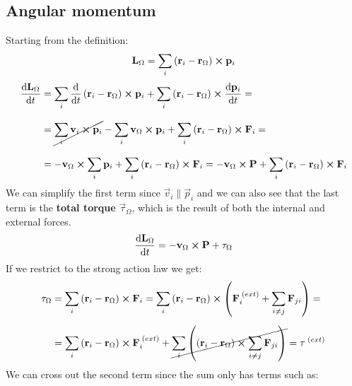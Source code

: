\subsection{Angular momentum}
Starting from the definition:
\begin{equation}
    \vb{L}_{\Omega} = \displaystyle\sum_{i}\left(\vb{r}_i-\vb{r}_{\Omega}\right)\cross\vb{p}_i
\end{equation}
\begin{equation}
    \begin{split}
      \dfrac{\dd{\vb{L}_{\Omega}}}{\dd{t}} &= \displaystyle\sum_{i}\dfrac{\dd{}}{\dd{t}}\left(\vb{r}_i-\vb{r}_{\Omega}\right)\cross\vb{p}_i + \displaystyle\sum_{i}\left(\vb{r}_i-\vb{r}_{\Omega}\right)\cross\dfrac{\dd{\vb{p}_i}}{\dd{t}} = \\[8pt]
      &= \cancel{\displaystyle\sum_{i}\vb{v}_i\cross\vb{p}_i}-\displaystyle\sum_{i}\vb{v}_{\Omega}\cross\vb{p}_i + \displaystyle\sum_{i}\left(\vb{r}_i-\vb{r}_{\Omega}\right)\cross\vb{F}_i = \\[8pt]
      &= -\vb{v}_{\Omega}\cross\displaystyle\sum_{i}\vb{p}_i + \displaystyle\sum_{i}\left(\vb{r}_i-\vb{r}_{\Omega}\right)\cross\vb{F}_i = -\vb{v}_{\Omega}\cross\vb{P} + \displaystyle\sum_{i}\left(\vb{r}_i-\vb{r}_{\Omega}\right)\cross\vb{F}_i
    \end{split}
\end{equation}
We can simplify the first term since $\vec{v}_i \parallel \vec{p}_i$ and we can also see that the last term is the \textbf{total torque} $\vec{\tau}_{\Omega}$, which is the result of both the internal and external forces.
\begin{equation} \label{e:first_angular_expression}
    \dfrac{\dd{\vb{L}_{\Omega}}}{\dd{t}} = -\vb{v}_{\Omega}\cross\vb{P} + \vb{\tau}_{\Omega}
\end{equation}
If we restrict to the strong action law we get:
\begin{equation}
    \begin{split}
      \vb{\tau}_{\Omega} &= \displaystyle\sum_{i}\left(\vb{r}_i-\vb{r}_{\Omega}\right)\cross\vb{F}_i = \displaystyle\sum_{i}\left(\vb{r}_i-\vb{r}_{\Omega}\right)\cross\left(\vb{F}_i^{\;(ext)}+ \displaystyle\sum_{i\neq j}\vb{F}_{ji}\right) = \\[8pt]
    &= \displaystyle\sum_{i}\left(\vb{r}_i-\vb{r}_{\Omega}\right)\cross\vb{F}_i^{\;(ext)} + \cancel{\displaystyle\sum_{i}\left(\left(\vb{r}_i-\vb{r}_{\Omega}\right)\cross\displaystyle\sum_{i\neq j}\vb{F}_{ji}\right)} = \vb{\tau}^{\;(ext)}
    \end{split}
\end{equation}
We can cross out the second term since the sum only has terms such as:
